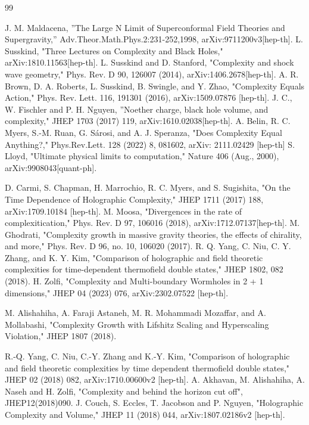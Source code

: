 \documentclass[]{article}
\begin{document}
\begin{thebibliography}{99}

 J. M. Maldacena, ''The Large N Limit of Superconformal Field Theories and Supergravity,'' Adv.Theor.Math.Phys.2:231-252,1998, arXiv:9711200v3[hep-th].
 L. Susskind, "Three Lectures on Complexity and Black Holes,"	arXiv:1810.11563[hep-th].
 L. Susskind and D. Stanford, "Complexity and shock wave geometry," Phys. Rev. D 90, 126007 (2014), arXiv:1406.2678[hep-th].
 A. R. Brown, D. A. Roberts, L. Susskind, B. Swingle, and Y. Zhao, "Complexity Equals Action," Phys. Rev. Lett. 116, 191301 (2016), 	arXiv:1509.07876 [hep-th].
J. C., W. Fischler and P. H. Nguyen, ''Noether charge, black hole volume, and complexity," JHEP 1703 (2017) 119, arXiv:1610.02038[hep-th].
A. Belin, R. C. Myers, S.-M. Ruan, G. Sárosi, and A. J. Speranza, "Does Complexity Equal Anything?," 
Phys.Rev.Lett. 128 (2022) 8, 081602, arXiv: 2111.02429 [hep-th]
 S. Lloyd, "Ultimate physical limits to computation," Nature 406 (Aug., 2000), arXiv:9908043[quant-ph].

 D. Carmi, S. Chapman, H. Marrochio, R. C. Myers, and S. Sugishita, "On the Time Dependence of Holographic Complexity," JHEP 1711 (2017) 188, arXiv:1709.10184 [hep-th].
 M. Moosa, "Divergences in the rate of complexitication," Phys. Rev. D 97, 106016 (2018), arXiv:1712.07137[hep-th].
 M. Ghodrati, "Complexity growth in massive gravity theories, the effects of chirality, and more," Phys. Rev. D 96, no. 10, 106020 (2017).
 R. Q. Yang, C. Niu, C. Y. Zhang, and K. Y. Kim, "Comparison of holographic and field theoretic complexities for time-dependent thermofield double states," JHEP 1802, 082 (2018).
H. Zolfi, "Complexity and Multi-boundary Wormholes in 2 + 1 dimensions," JHEP 04 (2023) 076, arXiv:2302.07522 [hep-th].

 M. Alishahiha, A. Faraji Astaneh, M. R. Mohammadi Mozaffar, and A. Mollabashi, "Complexity Growth with Lifshitz Scaling and Hyperscaling Violation," JHEP 1807 (2018).

R.-Q. Yang, C. Niu, C.-Y. Zhang and K.-Y. Kim, "Comparison of holographic and field theoretic complexities by time dependent thermofield double states," JHEP 02 (2018) 082, arXiv:1710.00600v2 [hep-th].
A. Akhavan, M. Alishahiha, A. Naseh and H. Zolfi, "Complexity and behind the horizon cut off", JHEP12(2018)090.
J. Couch, S. Eccles, T. Jacobson and P. Nguyen, "Holographic Complexity and Volume," JHEP 11 (2018) 044, arXiv:1807.02186v2 [hep-th].


\end{thebibliography}
\end{document}

